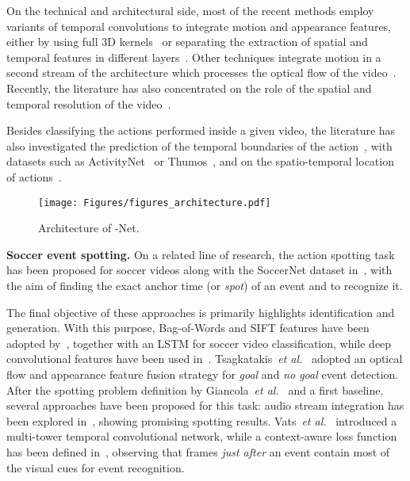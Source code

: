 \documentclass[a4paper,conference]{IEEEtran}
\def \OURS {-Net}
\newcommand{\tit}[1]{\smallbreak\noindent\textbf{#1.}}
\def \etal {\emph{et al.}}
\begin{document}
On the technical and architectural side, most of the recent methods employ variants of temporal convolutions to integrate motion and appearance features, either by using full 3D kernels~\cite{tran2015learning, carreira2017quo} or separating the extraction of spatial and temporal features in different layers~\cite{feichtenhofer2016spatiotemporal, varol2017long}. Other techniques integrate motion in a second stream of the architecture which processes the optical flow of the video~\cite{feichtenhofer2016convolutional,simonyan2014two}. Recently, the literature has also concentrated on the role of the spatial and temporal resolution of the video~\cite{feichtenhofer2019slowfast, Wu_2020_CVPR}.


Besides classifying the actions performed inside a given video, the literature has also investigated the prediction of the temporal boundaries of the action~\cite{zeng2019graph, lin2019bmn, lin2018bsn}, with datasets such as ActivityNet~\cite{caba2015activitynet} or Thumos~\cite{idrees2017thumos}, and on the spatio-temporal location of actions~\cite{gu2018ava}. 


\begin{figure}[t]
\centering
\texttt{[image: Figures/figures\_architecture.pdf]}
\caption{Architecture of \OURS.}
\label{fig:model}
\end{figure}

\tit{Soccer event spotting}
On a related line of research, the action spotting task has been proposed for soccer videos along with the SoccerNet dataset in~\cite{giancola2018soccernet}, with the aim of finding the exact anchor time (or \textit{spot}) of an event and to recognize it.

The final objective of these approaches is primarily highlights identification and generation. With this purpose, Bag-of-Words and SIFT features have been adopted by~\cite{baccouche2010action}, together with an LSTM for soccer video classification, while deep convolutional features have been used in~\cite{jiang2016automatic}. Tsagkatakis~\etal~\cite{tsagkatakis2017goal} adopted an optical flow and appearance feature fusion strategy for \textit{goal} and \textit{no goal} event detection. After the spotting problem definition by Giancola~\etal~\cite{giancola2018soccernet} and a first baseline, several approaches have been proposed for this task: audio stream integration has been explored in~\cite{vanderplaetse2020improved}, showing promising spotting results. Vats~\etal~\cite{vats2020event} introduced a multi-tower temporal convolutional network, while a context-aware loss function has been defined in~\cite{cioppa2020context}, observing that frames \textit{just after} an event contain most of the visual cues for event recognition.
\end{document}
